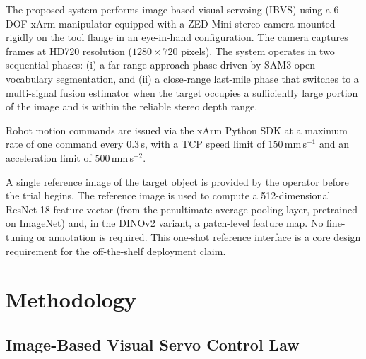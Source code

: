 \documentclass[lettersize,journal]{IEEEtran}
\begin{document}
The proposed system performs image-based visual servoing (IBVS) using a
6-DOF xArm manipulator equipped with a ZED Mini stereo camera mounted
rigidly on the tool flange in an eye-in-hand configuration. The camera
captures frames at HD720 resolution ($1280 \times 720$ pixels). The system
operates in two sequential phases: (i) a far-range approach phase driven by
SAM3 open-vocabulary segmentation, and (ii) a close-range last-mile phase that
switches to a multi-signal fusion estimator when the target occupies a
sufficiently large portion of the image and is within the reliable stereo
depth range.

Robot motion commands are issued via the xArm Python SDK at a maximum
rate of one command every $0.3$\,s, with a TCP speed limit of
$150$\,mm\,s$^{-1}$ and an acceleration limit of $500$\,mm\,s$^{-2}$.

A single reference image of the target object is provided by the operator
before the trial begins. The reference image is used to compute a
512-dimensional ResNet-18 feature vector (from the penultimate
average-pooling layer, pretrained on ImageNet) and, in the DINOv2 variant, a
patch-level feature map. No fine-tuning or annotation is required. This
one-shot reference interface is a core design requirement for the
off-the-shelf deployment claim.


\section{Methodology}
\label{sec:method}

\subsection{Image-Based Visual Servo Control Law}
\label{sec:ibvs}
\end{document}
